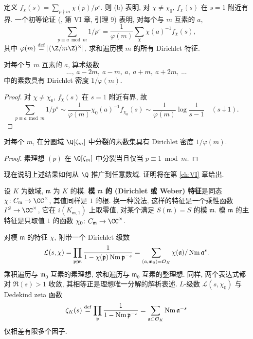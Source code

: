 定义 $f_{\chi}(s)=\sum_{p\nmid m}\chi(p)/p^s$. 则 (b) 表明, 对 $\chi\ne\chi_0$, $f_{\chi}(s)$ 在 $s=1$ 附近有界. 一个初等论证 (\cite{Serre1970}, 第 VI 章, 引理 9) 表明, 对每个与 $m$ 互素的 $a$,
\[
\sum_{p\equiv a\bmod m}1/p^s=\frac{1}{\varphi(m)}\sum_{\chi}\chi(a)^{-1}f_{\chi}(s),
\]
其中 $\varphi(m)\overset{\mathrm{def}}{=}|(\Z/m\Z)^{\times}|$, 求和遍历模 $m$ 的所有 Dirichlet 特征.

\begin{theorem}\label{thm:v.2.2}
对每个与 $m$ 互素的 $a$, 算术级数
\[
\ldots,\ a-2m,\ a-m,\ a,\ a+m,\ a+2m,\ \ldots
\]
中的素数具有 Dirichlet 密度 $1/\varphi(m)$.
\end{theorem}

\begin{proof}
对 $\chi\ne\chi_0$, $f_{\chi}(s)$ 在 $s=1$ 附近有界, 故
\[
\sum_{p\equiv a\bmod m}1/p^s\sim\frac{1}{\varphi(m)}\chi_0(a)^{-1}f_{\chi_0}(s)\sim\frac{1}{\varphi(m)}\log\frac{1}{s-1}\quad(s\downarrow 1).
\]
\end{proof}

\begin{corollary}\label{cor:v.2.3}
对每个 $m$, 在分圆域 $\Q[\zeta_m]$ 中分裂的素数集具有 Dirichlet 密度 $1/\varphi(m)$.
\end{corollary}

\begin{proof}
素理想 $(p)$ 在 $\Q[\zeta_m]$ 中分裂当且仅当 $p\equiv 1\bmod m$.
\end{proof}

现在说明上述结果如何从 $\Q$ 推广到任意数域. 证明将在第 \ref{ch:VI} 章给出.

设 $K$ 为数域, $\mathfrak{m}$ 为 $K$ 的模. \textbf{模 $\mathfrak{m}$ 的 (Dirichlet 或 Weber) 特征}是同态 $\chi\colon C_{\mathfrak{m}}\to\CC^{\times}$, 其值同样是 $1$ 的根. 换一种说法, 这样的特征是一个乘性函数 $I^S\to\CC^{\times}$, 它在 $i(K_{\mathfrak{m},1})$ 上取零值, 对某个满足 $S(\mathfrak{m})=S$ 的模 $\mathfrak{m}$. 模 $\mathfrak{m}$ 的主特征是只取值 $1$ 的函数 $\chi_0\colon C_{\mathfrak{m}}\to\CC^{\times}$.

对模 $\mathfrak{m}$ 的特征 $\chi$, 附带一个 Dirichlet 级数
\[
\mathcal{L}(s,\chi)=\prod_{\mathfrak{p}\nmid\mathfrak{m}}\frac{1}{1-\chi(\mathfrak{p})\operatorname{Nm}\mathfrak{p}^{-s}}=\sum_{(\mathfrak{a},\mathfrak{m}_0)=\mathcal{O}_K}\chi(\mathfrak{a})/\operatorname{Nm}\mathfrak{a}^s.
\]
乘积遍历与 $\mathfrak{m}_0$ 互素的素理想, 求和遍历与 $\mathfrak{m}_0$ 互素的整理想. 同样, 两个表达式都对 $\Re(s)>1$ 收敛, 其相等正是理想唯一分解的解析表述. $L$-级数 $\mathcal{L}(s,\chi_0)$ 与 Dedekind zeta 函数
\[
\zeta_K(s)\overset{\mathrm{def}}{=}\prod_{\mathfrak{p}}\frac{1}{1-\operatorname{Nm}\mathfrak{p}^{-s}}=\sum_{\mathfrak{a}\subset\mathcal{O}_K}\operatorname{Nm}\mathfrak{a}^{-s}
\]
仅相差有限多个因子.

